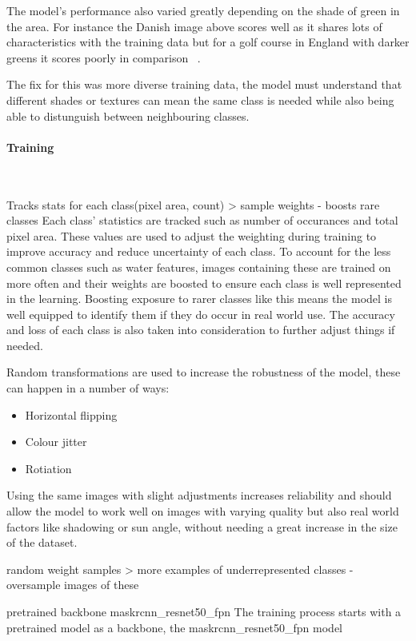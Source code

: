 \documentclass[final]{cmpreport_02}
\begin{document}
The model's performance also varied greatly depending on the shade of green in the area. For instance the Danish image above scores well as it shares lots of characteristics with the training data but for a golf course in England with darker greens it scores poorly in comparison ~.

The fix for this was more diverse training data, the model must understand that different shades or textures can mean the same class is needed while also being able to distunguish between neighbouring classes.

\paragraph{Training} \

Tracks stats for each class(pixel area, count) > sample weights - boosts rare classes
Each class' statistics are tracked such as number of occurances and total pixel area.
These values are used to adjust the weighting during training to improve accuracy and reduce uncertainty of each class.
To account for the less common classes such as water features, images containing these are trained on more often and their weights are boosted to ensure each class is well represented in the learning.
Boosting exposure to rarer classes like this means the model is well equipped to identify them if they do occur in real world use.
The accuracy and loss of each class is also taken into consideration to further adjust things if needed.

Random transformations are used to increase the robustness of the model, these can happen in a number of ways:

\begin{itemize}
	\item{Horizontal flipping}
	\item{Colour jitter}
	\item{Rotiation}
\end{itemize}
Using the same images with slight adjustments increases reliability and should allow the model to work well on images with varying quality but also real world factors like shadowing or sun angle, without needing a great increase in the size of the dataset.

random weight samples > more examples of underrepresented classes - oversample images of these

pretrained backbone maskrcnn_resnet50_fpn
The training process starts with a pretrained model as a backbone, the maskrcnn_resnet50_fpn model
\end{document}
